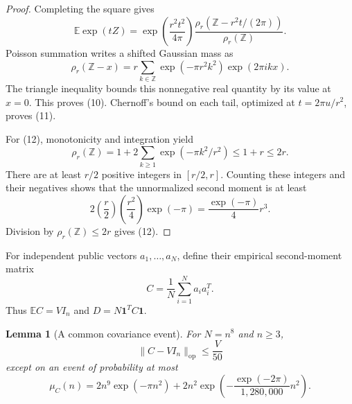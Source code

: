\documentclass[11pt]{article}
\newtheorem{lemma}[theorem]{Lemma}
\theoremstyle{remark}
\newcommand{\Z}{\mathbb Z}
\newcommand{\one}{\mathbf 1}
\newcommand{\E}{\mathbb E}
\begin{document}
\begin{proof}
Completing the square gives
\[
 \E\exp(tZ)
 =\exp\!\left(\frac{r^2t^2}{4\pi}\right)
 \frac{\rho_r(\Z-r^2t/(2\pi))}{\rho_r(\Z)}.
\]
Poisson summation writes a shifted Gaussian mass as
\[
 \rho_r(\Z-x)
 =r\sum_{k\in\Z}\exp(-\pi r^2k^2)\exp(2\pi i kx).
\]
The triangle inequality bounds this nonnegative real quantity by its
value at \(x=0\).  This proves (10).  Chernoff's bound on each tail,
optimized at \(t=2\pi u/r^2\), proves (11).

For (12), monotonicity and integration yield
\[
 \rho_r(\Z)=1+2\sum_{k\ge1}\exp(-\pi k^2/r^2)
 \le1+r\le2r.
\]
There are at least \(r/2\) positive integers in \([r/2,r]\).
Counting these integers and their negatives shows that the unnormalized
second moment is at least
\[
 2\left(\frac r2\right)\left(\frac{r^2}{4}\right)\exp(-\pi)
 =\frac{\exp(-\pi)}4r^3.
\]
Division by \(\rho_r(\Z)\le2r\) gives (12).
\end{proof}

For independent public vectors \(a_1,\ldots,a_N\), define their
empirical second-moment matrix
\[
 C=\frac1N\sum_{i=1}^N a_i a_i^T.
 \tag{13}
\]
Thus \(\E C=VI_n\) and \(D=N\one^TC\one\).

\begin{lemma}[A common covariance event]\label{lem:cov}
For \(N=n^8\) and \(n\ge3\),
\[
 \lVert C-VI_n\rVert_{\mathrm{op}}\le\frac V{50}
 \tag{14}
\]
except on an event of probability at most
\[
 \mu_C(n)=2n^9\exp(-\pi n^2)
 +2n^2\exp\!\left(
 -\frac{\exp(-2\pi)}{1{,}280{,}000}n^2\right).
 \tag{15}
\]
\end{lemma}
\end{document}
